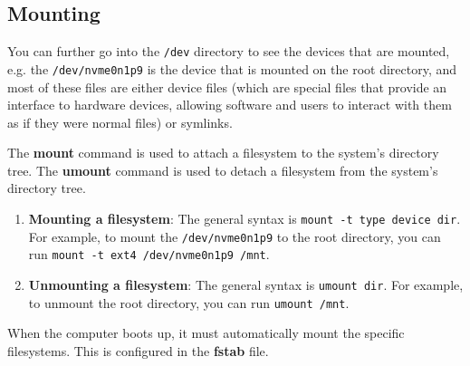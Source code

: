 \documentclass{article}
\begin{document}
  \subsection{Mounting} 

    You can further go into the \texttt{/dev} directory to see the devices that are mounted, e.g. the \texttt{/dev/nvme0n1p9} is the device that is mounted on the root directory, and most of these files are either device files (which are special files that provide an interface to hardware devices, allowing software and users to interact with them as if they were normal files) or symlinks.

    The \textbf{mount} command is used to attach a filesystem to the system's directory tree. The \textbf{umount} command is used to detach a filesystem from the system's directory tree. 

    \begin{enumerate}
      \item \textbf{Mounting a filesystem}: The general syntax is \texttt{mount -t type device dir}. For example, to mount the \texttt{/dev/nvme0n1p9} to the root directory, you can run \texttt{mount -t ext4 /dev/nvme0n1p9 /mnt}. 
      \item \textbf{Unmounting a filesystem}: The general syntax is \texttt{umount dir}. For example, to unmount the root directory, you can run \texttt{umount /mnt}. 
    \end{enumerate}

    When the computer boots up, it must automatically mount the specific filesystems. This is configured in the \textbf{fstab} file. 
\end{document}
